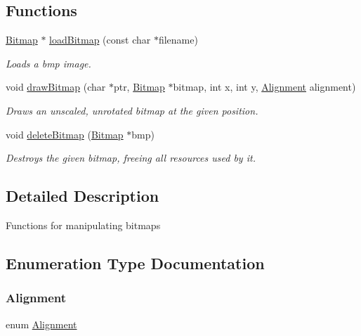 \subsection*{Functions}
\begin{DoxyCompactItemize}
\item 
\hyperlink{struct_bitmap}{Bitmap} $\ast$ \hyperlink{group___bitmap_ga3506880ffd407c36eb8aaddd2c1606d2}{load\+Bitmap} (const char $\ast$filename)
\begin{DoxyCompactList}\small\item\em Loads a bmp image. \end{DoxyCompactList}\item 
void \hyperlink{group___bitmap_ga82a8171067b55f72cc29c8c50d8330c6}{draw\+Bitmap} (char $\ast$ptr, \hyperlink{struct_bitmap}{Bitmap} $\ast$bitmap, int x, int y, \hyperlink{group___bitmap_gacdfaca60ec19c0265bac2692d7982726}{Alignment} alignment)
\begin{DoxyCompactList}\small\item\em Draws an unscaled, unrotated bitmap at the given position. \end{DoxyCompactList}\item 
void \hyperlink{group___bitmap_ga08c1d4f4fff81df260d979ea8fc1aa61}{delete\+Bitmap} (\hyperlink{struct_bitmap}{Bitmap} $\ast$bmp)
\begin{DoxyCompactList}\small\item\em Destroys the given bitmap, freeing all resources used by it. \end{DoxyCompactList}\end{DoxyCompactItemize}


\subsection{Detailed Description}
Functions for manipulating bitmaps 

\subsection{Enumeration Type Documentation}
\hypertarget{group___bitmap_gacdfaca60ec19c0265bac2692d7982726}{}\label{group___bitmap_gacdfaca60ec19c0265bac2692d7982726} 
\subsubsection{\texorpdfstring{Alignment}{Alignment}}
{\footnotesize\ttfamily enum \hyperlink{group___bitmap_gacdfaca60ec19c0265bac2692d7982726}{Alignment}}

